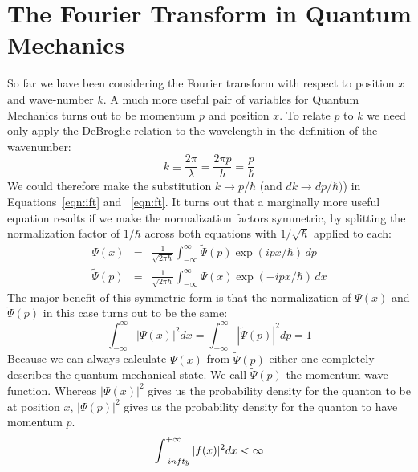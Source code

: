 \documentclass[12pt]{book}
\begin{document}
\section{The Fourier Transform in Quantum Mechanics}

So far we have been considering the Fourier transform with respect to position $x$ and wave-number $k$.  A much more useful pair of variables for Quantum Mechanics turns out to be momentum $p$ and position $x$.  To relate $p$ to $k$ we need only apply the DeBroglie relation to the wavelength in the definition of the wavenumber:
\begin{displaymath}
k \equiv \frac{2 \pi}{\lambda} = \frac{2 \pi p}{h} = \frac{p}{\hbar}
\end{displaymath}
We could therefore make the substitution $k \to p/\hbar$ (and $dk \to dp / \hbar)$) in Equations~\ref{eqn:ift} and ~\ref{eqn:ft}.  It turns out that a marginally more useful equation results if we make the normalization factors symmetric, by splitting the normalization factor of $1/\hbar$ across both equations with $1/\sqrt{\hbar}$ applied to each:
\begin{eqnarray} 
\Psi(x) &=& \frac{1}{\sqrt{2\pi\hbar}} \int_{-\infty}^{\infty} \widetilde{\Psi}(p) \exp(ipx/\hbar) \, dp \\
\widetilde{\Psi}(p) &=&  \frac{1}{\sqrt{2\pi\hbar}} \int_{-\infty}^{\infty} {\Psi}(x) \exp(-ipx/\hbar) \, dx
\end{eqnarray}
The major benefit of this symmetric form is that the normalization of $\Psi(x)$ and $\widetilde{\Psi}(p)$ in this case turns out to be the same:
\begin{displaymath}
\int_{-\infty}^{\infty} |\Psi(x)|^2 dx = \int_{-\infty}^{\infty} |\widetilde{\Psi}(p)|^2 dp = 1 
\end{displaymath}
Because we can always calculate $\Psi(x)$ from $\widetilde{\Psi}(p)$ either one completely describes the quantum mechanical state.  We call $\widetilde{\Psi}(p)$ the momentum wave function.   Whereas $|\Psi(x)|^2$ gives us the probability density for the quanton to be at position $x$, $|\Psi(p)|^2$ gives us the probability density for the quanton to have momentum $p$.
$$\int_{-\\infty}^{+\infty} |f(x)|^2 dx < \infty$$
\end{document}
